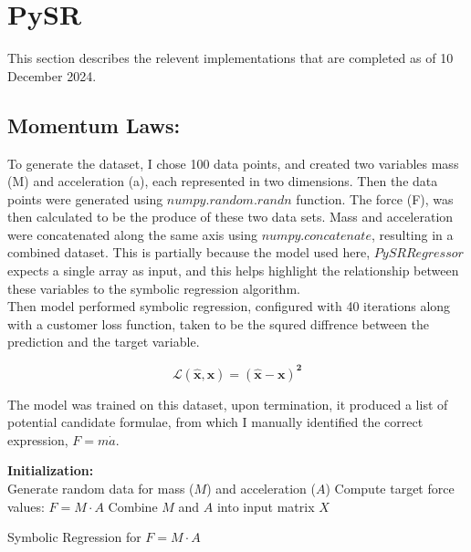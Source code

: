\documentclass{article}
\begin{document}
\section{PySR}

This section describes the relevent implementations that are completed as of 10 December 2024.\\ 

\subsection{Momentum Laws: }

To generate the dataset, I chose 100 data points, and created two variables mass (M) and acceleration (a), each represented in two dimensions. Then the data points were generated using $numpy.random.randn$ function. The force (F), was then calculated to be the produce of these two data sets. Mass and acceleration were concatenated along the same axis using $numpy.concatenate$, resulting in a combined dataset. This is partially because the model used here, $PySRRegressor$ expects a single array as input, and this helps highlight the relationship between these variables to the symbolic regression algorithm.\\ 

Then model performed symbolic regression, configured with 40 iterations along with a customer loss function, taken to be the squred diffrence between the prediction and the target variable. \\ 

\begin{center}
  
  $$
  {\boldsymbol{\mathcal{L}(\hat{x}, x) = (\hat{x} - x)^2}}
$$

\end{center}


The model was trained on this dataset, upon termination, it produced a list of potential candidate formulae, from which I manually identified the correct expression, $F = m \dot a$. \\



\begin{algorithm}[H]
\SetAlgoLined
{}
\textbf{Initialization:} \\
Generate random data for mass (\( M \)) and acceleration (\( A \))\;
Compute target force values: \( F = M \cdot A \)\;
Combine \( M \) and \( A \) into input matrix \( X \)\;

\caption{Symbolic Regression for \( F = M \cdot A \)}
\end{algorithm}
\end{document}
